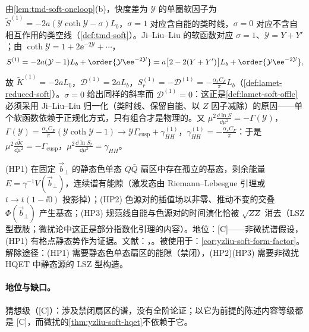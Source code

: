\begin{example}[单圈离光锥软函数与 $S_r$]\label{ex:yzliu-soft-oneloop}
由\cref{lem:tmd-soft-oneloop}(b)，快度差为 $\mathcal Y$ 的单圈软因子为 $\tilde S^{(1)}=-2a(\mathcal Y\coth\mathcal Y-\sigma)L_b$，$\sigma=1$ 对应含自能的类时线，$\sigma=0$ 对应不含自相互作用的类空线（\cref{def:tmd-soft}）。Ji--Liu--Liu 的软函数对应 $\sigma=1$、$\mathcal Y=Y+Y'$；由 $\coth\mathcal Y=1+2\ee^{-2\mathcal Y}+\cdots$，%
\begin{equation}\label{eq:yzliu-soft-oneloop}
S^{(1)}=-2a(\mathcal Y-1)L_b+\order{\mathcal Y\ee^{-2\mathcal Y}}=a\big[2-2(Y+Y')\big]L_b+\order{\mathcal Y\ee^{-2\mathcal Y}} ,
\end{equation}
故 $\tilde K^{(1)}=-2aL_b$，$\mathcal D^{(1)}=2aL_b$，$S_r^{(1)}=-\mathcal D^{(1)}=-\frac{\alpha_sC_F}{\pi}L_b$（\cref{def:lamet-reduced-soft}）。$\sigma=0$ 给出同样的斜率而 $\mathcal D^{(1)}=0$：这正是\cref{def:lamet-soft-offlc}必须采用 Ji--Liu--Liu 归一化（类时线、保留自能、以 $Z$ 因子减除）的原因——单个软函数依赖于正规化方式，只有组合才是物理的。又 $\mu^2\frac{\dd\ln S}{\dd\mu^2}=-\Gamma(\mathcal Y)$，$\Gamma(\mathcal Y)=\frac{\alpha_sC_F}{\pi}(\mathcal Y\coth\mathcal Y-1)\to\mathcal Y\Gamma_{\mathrm{cusp}}+\gamma^{(1)}_{HH}$，$\gamma^{(1)}_{HH}=-\frac{\alpha_sC_F}{\pi}$：于是 $\mu^2\frac{\dd\tilde K}{\dd\mu^2}=-\Gamma_{\mathrm{cusp}}$，$\mu^2\frac{\dd\ln S_r}{\dd\mu^2}=\gamma_{HH}$。
\end{example}

\begin{assumption}\label{asm:yzliu-heavy-pair}
(HP1) 在固定 $\vec b_\perp$ 的静态色单态 $Q\bar Q$ 扇区中存在孤立的基态，剩余能量 $E=\gamma^{-1}V(\vec b_\perp)$，连续谱有能隙（激发态由 Riemann--Lebesgue 引理或 $t\to t(1-\ii0)$ 投影掉）；(HP2) 色源对的插值场以非零、推动不变的交叠 $\Phi(\vec b_\perp)$ 产生基态；(HP3) 规范线自能与色源对的时间演化恰被 $\sqrt{ZZ}$ 消去（LSZ 型截肢；微扰论中这正是部分指数化引理的内容）。地位：[C]——非微扰谱假设，(HP1) 有格点静态势作为证据。文献：\cite{Ji:2019sxk}，\cite[第~4.1--4.2~节、附录~A]{Liu:2022nnk}。被使用于：\cref{cor:yzliu-soft-form-factor}。解除途径：(HP1) 需要静态色单态扇区的能隙（禁闭），(HP2)(HP3) 需要非微扰 HQET 中静态源的 LSZ 型构造。
\end{assumption}

\paragraph{地位与缺口。}猜想级（[C]）：涉及禁闭扇区的谱，没有全阶论证；以它为前提的陈述内容等级都是 [C]，而微扰的\cref{thm:yzliu-soft-hqet}不依赖于它。

